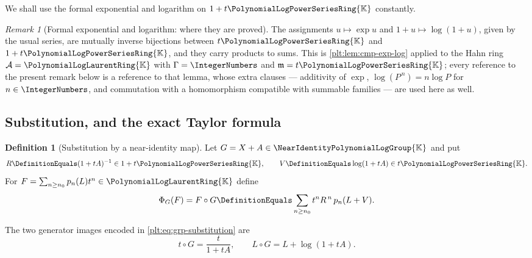 \documentclass[11pt,oneside]{article}
\theoremstyle{plain}
\theoremstyle{definition}
\newtheorem{definition}[theorem]{Definition}
\theoremstyle{remark}
\newtheorem{remark}[theorem]{Remark}
\newcommand{\K}{\mathbb{K}}
\newcommand{\PLpow}{\PolynomialLogPowerSeriesRing{\K}}   %
\newcommand{\PLlau}{\PolynomialLogLaurentRing{\K}}       %
\newcommand{\Gnear}{\NearIdentityPolynomialLogGroup{\K}} %
\newcommand{\compose}{\mathbin{\circ}}
\begin{document}
We shall use the formal exponential and logarithm on \(1+t\PLpow\) constantly.

\begin{remark}[Formal exponential and logarithm: where they are proved]
\label{plt:lem:grp-explog}
The assignments \(u\mapsto\exp u\) and \(1+u\mapsto\log(1+u)\), given by the
usual series, are mutually inverse bijections between \(t\PLpow\) and
\(1+t\PLpow\), and they carry products to sums.  This is
\cref{plt:lem:cmp-exp-log} applied to the Hahn ring
\(\mathcal A=\PLlau\) with \(\Gamma=\IntegerNumbers\) and
\(\mathfrak m=t\PLpow\); every reference to the present remark below is a
reference to that lemma, whose extra clauses --- additivity of \(\exp\),
\(\log(P^{\,n})=n\log P\) for \(n\in\IntegerNumbers\), and commutation with a
homomorphism compatible with summable families --- are used here as well.
\end{remark}

\subsection{Substitution, and the exact Taylor formula}

\begin{definition}[Substitution by a near-identity map]
\label{plt:def:grp-substitution}
Let \(G=X+A\in\Gnear\) and put
\[
  R\DefinitionEquals(1+tA)^{-1}\in1+t\PLpow,
  \qquad
  V\DefinitionEquals\log(1+tA)\in t\PLpow .
\]
For \(F=\sum_{n\ge n_0}p_n(L)t^n\in\PLlau\) define
\begin{equation}\label{plt:eq:grp-substitution}
  \Phi_G(F)=F\compose G
  \DefinitionEquals
  \sum_{n\ge n_0}t^nR^{\,n}\,p_n(L+V).
\end{equation}
\end{definition}

The two generator images encoded in \eqref{plt:eq:grp-substitution} are
\begin{equation}\label{plt:eq:grp-generators}
  t\compose G=\frac{t}{1+tA},
  \qquad
  L\compose G=L+\log(1+tA).
\end{equation}
\end{document}
